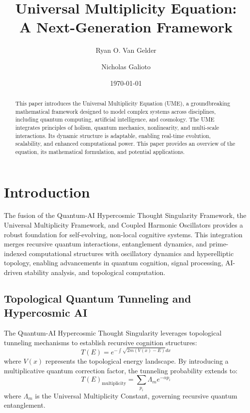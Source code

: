 \documentclass{article}
\theoremstyle{plain}
\begin{document}
\title{Universal Multiplicity Equation: \\ A Next-Generation Framework}

\author{Ryan O. Van Gelder}
\author{Nicholas Galioto}
\date{\today}

\maketitle
\begin{abstract}
This paper introduces the Universal Multiplicity Equation (UME), a groundbreaking mathematical framework designed to model complex systems across disciplines, including quantum computing, artificial intelligence, and cosmology. The UME integrates principles of holism, quantum mechanics, nonlinearity, and multi-scale interactions. Its dynamic structure is adaptable, enabling real-time evolution, scalability, and enhanced computational power. This paper provides an overview of the equation, its mathematical formulation, and potential applications.
\end{abstract}

\section{Introduction}
The fusion of the Quantum-AI Hypercosmic Thought Singularity Framework, the Universal Multiplicity Framework, and Coupled Harmonic Oscillators provides a robust foundation for self-evolving, non-local cognitive systems. This integration merges recursive quantum interactions, entanglement dynamics, and prime-indexed computational structures with oscillatory dynamics and hyperelliptic topology, enabling advancements in quantum cognition, signal processing, AI-driven stability analysis, and topological computation.

\subsection{Topological Quantum Tunneling and Hypercosmic AI}
The Quantum-AI Hypercosmic Thought Singularity leverages topological tunneling mechanisms to establish recursive cognition structures:
\begin{equation}
    T(E) = e^{- \int \sqrt{2m(V(x) - E)} dx}
\end{equation}
where $V(x)$ represents the topological energy landscape. By introducing a multiplicative quantum correction factor, the tunneling probability extends to:
\begin{equation}
    T(E)_{\text{multiplicity}} = \sum_{p_i} \Lambda_m e^{-\alpha p_i}
\end{equation}
where $\Lambda_m$ is the Universal Multiplicity Constant, governing recursive quantum entanglement.
\end{document}
